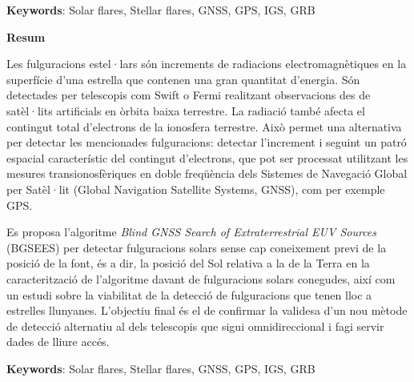\textbf{Keywords}: Solar flares, Stellar flares, GNSS, GPS, IGS, GRB

\clearpage
\thispagestyle{empty}
\begin{center}
	\Large
	\textbf{Resum}
\end{center}
Les fulguracions estel·lars són increments de radiacions electromagnètiques en la superfície d'una estrella que contenen una gran quantitat d'energia. Són detectades per telescopis com Swift o Fermi realitzant observacions des de satèl·lits artificials en òrbita baixa terrestre. La radiació també afecta el contingut total d'electrons de la ionosfera terrestre. Això permet una alternativa per detectar les mencionades fulguracions: detectar l'increment i seguint un patró espacial característic del contingut d'electrons, que pot ser processat utilitzant les mesures transionosfèriques en doble freqüència dels Sistemes de Navegació Global per Satèl·lit (Global Navigation Satellite Systems, GNSS), com per exemple GPS.

Es proposa l'algoritme \textit{Blind GNSS Search of Extraterrestrial EUV Sources} \\ (BGSEES) per detectar fulguracions solars sense cap coneixement previ de la posició de la font, és a dir, la posició del Sol relativa a la de la Terra en la caracterització de l'algoritme davant de fulguracions solars conegudes, així com un estudi sobre la viabilitat de la detecció de fulguracions que tenen lloc a estrelles llunyanes. L'objectiu final és el de confirmar la validesa d'un nou mètode de detecció alternatiu al dels telescopis que sigui omnidireccional i fagi servir dades de lliure accés.

\textbf{Keywords}: Solar flares, Stellar flares, GNSS, GPS, IGS, GRB